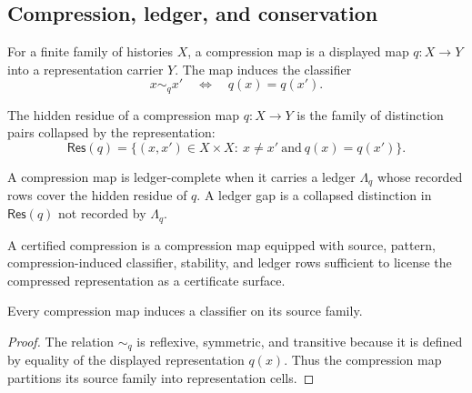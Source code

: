 \subsection{Compression, ledger, and conservation}
\label{subsec:philosophy-compression-ledger-conservation}

\begin{definition}
\label{def:philosophy-compression-map}
For a finite family of histories $X$, a compression map is a displayed
map $q:X\to Y$ into a representation carrier $Y$. The map induces the
classifier
$$
x\sim_q x'
\quad\Longleftrightarrow\quad
q(x)=q(x').
$$
\end{definition}

\begin{definition}
\label{def:philosophy-hidden-residue}
The hidden residue of a compression map $q:X\to Y$ is the family of
distinction pairs collapsed by the representation:
$$
\mathsf{Res}(q)
=
\{(x,x')\in X\times X:\ x\neq x'\ \text{and}\ q(x)=q(x')\}.
$$
\end{definition}

\begin{definition}
\label{def:philosophy-ledger-complete-compression}
A compression map is ledger-complete when it carries a ledger
$\Lambda_q$ whose recorded rows cover the hidden residue of $q$. A
ledger gap is a collapsed distinction in $\mathsf{Res}(q)$ not recorded
by $\Lambda_q$.
\end{definition}

\begin{definition}
\label{def:philosophy-certified-compression}
A certified compression is a compression map equipped with source,
pattern, compression-induced classifier, stability, and ledger rows
sufficient to license the compressed representation as a certificate
surface.
\end{definition}

\begin{theorem}
\label{thm:philosophy-compression-classifier-formation}
Every compression map induces a classifier on its source family.
\end{theorem}
\begin{proof}
The relation $\sim_q$ is reflexive, symmetric, and transitive because it
is defined by equality of the displayed representation $q(x)$. Thus the
compression map partitions its source family into representation cells.
\end{proof}

